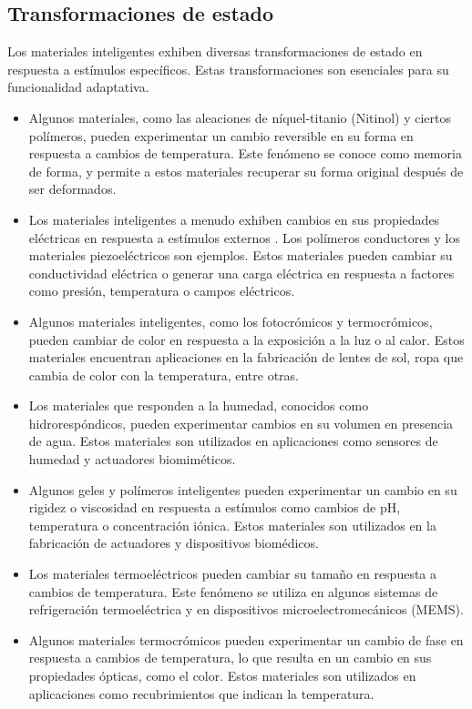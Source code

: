 \subsection{Transformaciones de estado}
Los materiales inteligentes exhiben diversas transformaciones de estado en respuesta a estímulos específicos. Estas transformaciones son esenciales para su funcionalidad adaptativa.
    \begin{itemize}
        \item Algunos materiales, como las aleaciones de níquel-titanio (Nitinol) y ciertos polímeros, pueden experimentar un cambio reversible en su forma en respuesta a cambios de temperatura. Este fenómeno se conoce como memoria de forma, y permite a estos materiales recuperar su forma original después de ser deformados.
        \item Los materiales inteligentes a menudo exhiben cambios en sus propiedades eléctricas en respuesta a estímulos externos \cite{castagnino-mat-nanotecnologia}. Los polímeros conductores y los materiales piezoeléctricos son ejemplos. Estos materiales pueden cambiar su conductividad eléctrica o generar una carga eléctrica en respuesta a factores como presión, temperatura o campos eléctricos.
        \item Algunos materiales inteligentes, como los fotocrómicos y termocrómicos, pueden cambiar de color en respuesta a la exposición a la luz o al calor. Estos materiales encuentran aplicaciones en la fabricación de lentes de sol, ropa que cambia de color con la temperatura, entre otras.
        \item Los materiales que responden a la humedad, conocidos como hidrorespóndicos, pueden experimentar cambios en su volumen en presencia de agua. Estos materiales son utilizados en aplicaciones como sensores de humedad y actuadores biomiméticos.
        \item Algunos geles y polímeros inteligentes pueden experimentar un cambio en su rigidez o viscosidad en respuesta a estímulos como cambios de pH, temperatura o concentración iónica. Estos materiales son utilizados en la fabricación de actuadores y dispositivos biomédicos.
        \item Los materiales termoeléctricos pueden cambiar su tamaño en respuesta a cambios de temperatura. Este fenómeno se utiliza en algunos sistemas de refrigeración termoeléctrica y en dispositivos microelectromecánicos (MEMS).
        \item Algunos materiales termocrómicos pueden experimentar un cambio de fase en respuesta a cambios de temperatura, lo que resulta en un cambio en sus propiedades ópticas, como el color. Estos materiales son utilizados en aplicaciones como recubrimientos que indican la temperatura.
    \end{itemize}
